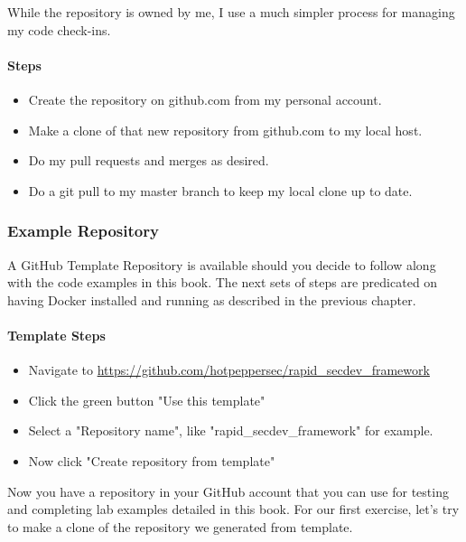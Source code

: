 While the repository is owned by me, I use a much simpler process for
managing my code check-ins.

\hypertarget{steps-2}{%
\paragraph{Steps}\label{steps-2}}

\begin{itemize}
\tightlist
\item
  Create the repository on github.com from my personal account.
\item
  Make a clone of that new repository from github.com to my local host.
\item
  Do my pull requests and merges as desired.
\item
  Do a git pull to my master branch to keep my local clone up to date.
\end{itemize}

\hypertarget{example-repository}{%
\subsubsection{Example Repository}\label{example-repository}}

A GitHub Template Repository is available should you decide to follow
along with the code examples in this book. The next sets of steps are
predicated on having Docker installed and running as described in the
previous chapter.

\hypertarget{template-steps}{%
\paragraph{Template Steps}\label{template-steps}}

\begin{itemize}
\tightlist
\item
  Navigate to
  \url{https://github.com/hotpeppersec/rapid_secdev_framework}
\item
  Click the green button "Use this template"
\item
  Select a "Repository name", like "rapid\_secdev\_framework" for
  example.
\item
  Now click "Create repository from template"
\end{itemize}

Now you have a repository in your GitHub account that you can use for
testing and completing lab examples detailed in this book. For our first
exercise, let's try to make a clone of the repository we generated from
template.

